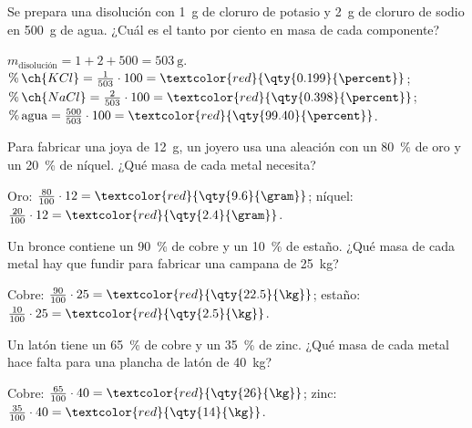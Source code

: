 \begin{exercise}
    Se prepara una disolución con \qty{1}{\gram} de cloruro de potasio y \qty{2}{\gram} de cloruro de sodio en \qty{500}{\gram} de agua. ¿Cuál es el tanto por ciento en masa de cada componente?
    \begin{solu}
        \(m_\text{disolución} = 1 + 2 + 500 = \qty{503}{\gram}\).
        \(\%\,\ch{KCl} = \frac{1}{503} \cdot 100 = \textcolor{red}{\qty{0.199}{\percent}}\); \(\%\,\ch{NaCl} = \frac{2}{503} \cdot 100 = \textcolor{red}{\qty{0.398}{\percent}}\); \(\%\,\text{agua} = \frac{500}{503} \cdot 100 = \textcolor{red}{\qty{99.40}{\percent}}\).
    \end{solu}
\end{exercise}

\begin{exercise}
    Para fabricar una joya de \qty{12}{\gram}, un joyero usa una aleación con un \qty{80}{\percent} de oro y un \qty{20}{\percent} de níquel. ¿Qué masa de cada metal necesita?
    \begin{solu}
        Oro: \(\frac{80}{100} \cdot 12 = \textcolor{red}{\qty{9.6}{\gram}}\); níquel: \(\frac{20}{100} \cdot 12 = \textcolor{red}{\qty{2.4}{\gram}}\).
    \end{solu}
\end{exercise}

\begin{exercise}
    Un bronce contiene un \qty{90}{\percent} de cobre y un \qty{10}{\percent} de estaño. ¿Qué masa de cada metal hay que fundir para fabricar una campana de \qty{25}{\kg}?
    \begin{solu}
        Cobre: \(\frac{90}{100} \cdot 25 = \textcolor{red}{\qty{22.5}{\kg}}\); estaño: \(\frac{10}{100} \cdot 25 = \textcolor{red}{\qty{2.5}{\kg}}\).
    \end{solu}
\end{exercise}

\begin{exercise}
    Un latón tiene un \qty{65}{\percent} de cobre y un \qty{35}{\percent} de zinc. ¿Qué masa de cada metal hace falta para una plancha de latón de \qty{40}{\kg}?
    \begin{solu}
        Cobre: \(\frac{65}{100} \cdot 40 = \textcolor{red}{\qty{26}{\kg}}\); zinc: \(\frac{35}{100} \cdot 40 = \textcolor{red}{\qty{14}{\kg}}\).
    \end{solu}
\end{exercise}

